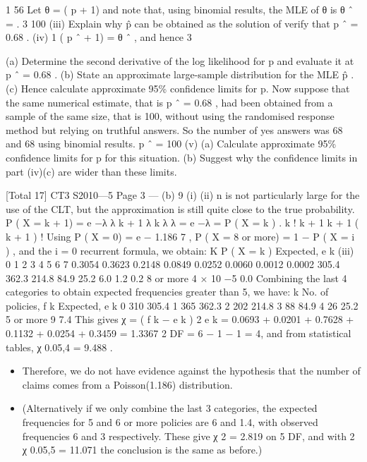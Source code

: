 \documentclass[a4paper,12pt]{article}
\begin{document}
\begin{enumerate}
\begin{itemize}
\end{itemize}

1
56
Let θ = ( p + 1) and note that, using binomial results, the MLE of θ is θ ˆ =
.
3
100
(iii)
Explain why p̂ can be obtained as the solution of
verify that p ˆ = 0.68 .
(iv)
1
( p ˆ + 1) = θ ˆ , and hence
3

(a) Determine the second derivative of the log likelihood for p and
evaluate it at p ˆ = 0.68 .
(b) State an approximate large-sample distribution for the MLE p̂ .
(c) Hence calculate approximate 95\% confidence limits for p.
Now suppose that the same numerical estimate, that is p ˆ = 0.68 , had been obtained from a sample of the same size, that is 100, without using the randomised response method but relying on truthful answers. So the number of yes answers was 68 and
68
using binomial results.
p ˆ =
100
(v)
(a) Calculate approximate 95\% confidence limits for p for this situation.
(b) Suggest why the confidence limits in part (iv)(c) are wider than these
limits.

[Total 17]
CT3 S2010—5
Page 3  — %
(b)
9
(i)
(ii)
n is not particularly large for the use of the CLT, but the approximation
is still quite close to the true probability.
P ( X = k + 1) = e −λ
λ k + 1
λ k λ
λ
= e −λ
=
P ( X = k ) .
k ! k + 1 k + 1
( k + 1 ) !
Using P ( X = 0) = e
− 1.186
7
, P ( X = 8 or more) = 1 − \sum P ( X = i ) , and the
i = 0
recurrent formula, we obtain:
K
P ( X = k )
Expected, e k
(iii)
0
1
2
3
4
5
6
7
0.3054 0.3623 0.2148 0.0849 0.0252 0.0060 0.0012 0.0002
305.4 362.3 214.8
84.9
25.2
6.0
1.2
0.2
8 or more
4 × 10 −5
0.0
Combining the last 4 categories to obtain expected frequencies greater than 5,
we have:
k
No. of policies, f k
Expected, e k
0
310
305.4
1
365
362.3
2
202
214.8
3
88
84.9
4
26
25.2
5 or more
9
7.4
This gives
χ = 
( f k − e k ) 2
e k
= 0.0693 + 0.0201 + 0.7628 + 0.1132 + 0.0254 + 0.3459 = 1.3367
2
DF = 6 − 1 − 1 = 4, and from statistical tables, χ 0.05,4
= 9.488 .
\begin{itemize}
\item Therefore, we do not have evidence against the hypothesis that the number of
claims comes from a Poisson(1.186) distribution.
\item (Alternatively if we only combine the last 3 categories, the expected
frequencies for 5 and 6 or more policies are 6 and 1.4, with observed
frequencies 6 and 3 respectively. These give χ 2 = 2.819 on 5 DF, and with
2
χ 0.05,5
= 11.071 the conclusion is the same as before.)
\end{itemize}


\end{enumerate}
\end{document}
